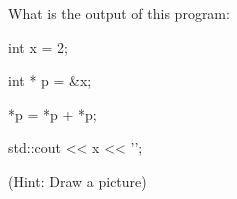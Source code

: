 What is the output of this program:

\begin{consolethree}[escapeinside=||]

int x = 2;

int * p = &x;

*p = *p + *p;

std::cout << x << '\n';

\end{consolethree}

(Hint: Draw a picture)

